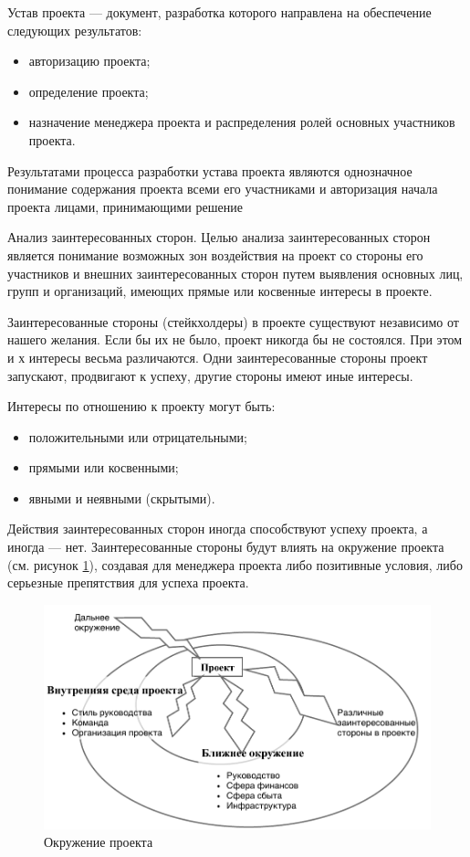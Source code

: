 Устав проекта --- документ, разработка которого направлена на обеспечение следующих результатов:
\begin{itemize}
	\item авторизацию проекта;
\item определение проекта;
\item назначение менеджера проекта и распределения ролей основных участников проекта.
\end{itemize}

Результатами процесса разработки устава проекта являются однознач­ное понимание содержания проекта всеми его участниками и автори­зация начала проекта лицами, принимающими решение \cite[135--137]{polkovnikov}

Анализ заинтересованных сторон.
Целью анализа заинтересованных сторон является понимание возмож­ных зон воздействия на проект со стороны его участников и внешних заинтересованных сторон путем выявления основных лиц, групп и организаций, имеющих прямые или косвенные интересы в проекте.

Заинтересованные стороны (стейкхолдеры) в проекте существуют независимо от нашего желания.
Если бы их не было, проект никогда бы не состоялся.
При этом и х интересы весьма различаются.
Одни заинтересованные стороны проект запускают, продвигают к успеху, другие стороны имеют иные интересы.

Интересы по отношению к проекту могут быть:
\begin{itemize}
	\item положительными или отрицательными;
	\item прямыми или косвенными;
	\item явными и неявными (скрытыми).
\end{itemize}

Действия заинтересованных сторон иногда способствуют успеху проекта, а иногда --- нет.
Заинтересованные стороны будут влиять на окружение проекта (см. рисунок \ref{fig:okuzhenie}), создавая для менеджера проекта либо позитивные условия, либо серьезные препятствия для успеха проекта.

\begin{figure}[h]
	\centering
	\includegraphics[width=\linewidth]{okruzh}
	\caption{Окружение проекта}
	\label{fig:okuzhenie}
\end{figure}

